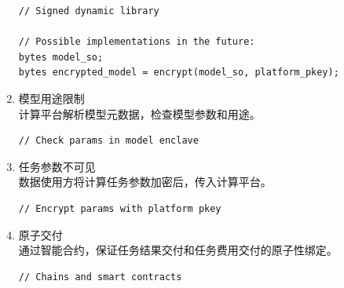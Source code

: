 \begin{enumerate}
    \begin{lstlisting}
// Signed dynamic library

// Possible implementations in the future: 
bytes model_so; 
bytes encrypted_model = encrypt(model_so, platform_pkey); 
    \end{lstlisting}

    \item 模型用途限制\\ 
    计算平台解析模型元数据，检查模型参数和用途。

    \begin{lstlisting}
// Check params in model enclave
    \end{lstlisting}

    \item 任务参数不可见\\ 
    数据使用方将计算任务参数加密后，传入计算平台。
    
    \begin{lstlisting}
// Encrypt params with platform pkey
    \end{lstlisting}
    
    \item 原子交付\\
    通过智能合约，保证任务结果交付和任务费用交付的原子性绑定。

    \begin{lstlisting}
// Chains and smart contracts
    \end{lstlisting}

\end{enumerate}

